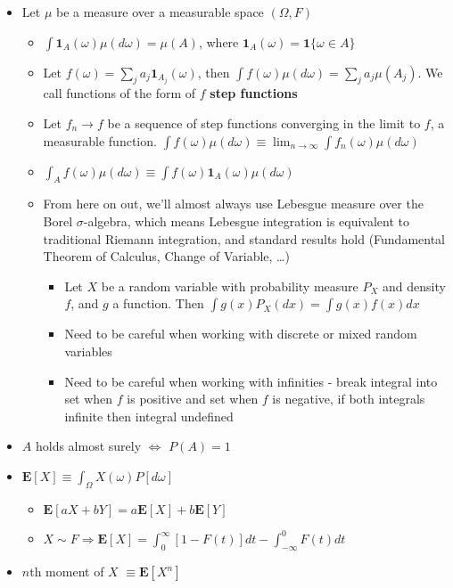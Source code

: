 \documentclass[12pt,english]{article}
\begin{document}
\begin{itemize}
	\item Let $\mu$ be a measure over a measurable space $(\Omega, F)$
	\begin{itemize}
		\item $\int \mathbf{1}_{A}(\omega) \mu(d\omega) = \mu(A)$, where $\mathbf{1}_{A}(\omega) = \mathbf{1} \{ \omega \in A \}$
		\item Let $f(\omega) = \sum_{j} a_{j} \mathbf{1}_{A_{j}}(\omega)$, then $\int f(\omega) \mu(d\omega) = \sum_{j} a_{j} \mu(A_{j})$. We call functions of the form of $f$ \textbf{step functions}
		\item Let $f_{n} \to f$ be a sequence of step functions converging in the limit to $f$, a measurable function. $\int f(\omega) \mu(d\omega) \equiv \lim_{n \to \infty} \int f_{n}(\omega) \mu(d\omega)$
		\item $\int_{A} f(\omega) \mu(d\omega) \equiv \int f(\omega) \mathbf{1}_{A}(\omega) \mu(d\omega)$
		\item From here on out, we'll almost always use Lebesgue measure over the Borel $\sigma$-algebra, which means Lebesgue integration is equivalent to traditional Riemann integration, and standard results hold (Fundamental Theorem of Calculus, Change of Variable, \ldots)
		\begin{itemize}
			\item Let $X$ be a random variable with probability measure $P_{X}$ and density $f$, and $g$ a function. Then $\int g(x) P_{X}(dx) = \int g(x) f(x) dx$
			\item Need to be careful when working with discrete or mixed random variables
			\item Need to be careful when working with infinities - break integral into set when $f$ is positive and set when $f$ is negative, if both integrals infinite then integral undefined
		\end{itemize}
	\end{itemize}
	\item $A$ holds almost surely $\Leftrightarrow$ $P(A) = 1$
	\item $\mathbf{E}[X] \equiv \int_{\Omega} X(\omega) P[d\omega]$
	\begin{itemize}
		\item $\mathbf{E}[aX + bY] = a\mathbf{E}[X] + b \mathbf{E}[Y]$
		\item $X \sim F \Rightarrow \mathbf{E}[X] = \int_{0}^{\infty} [1 - F(t)]dt - \int_{-\infty}^{0} F(t) dt$
	\end{itemize}
	\item $n$th moment of $X$ $\equiv \mathbf{E}[X^{n}]$

\end{itemize}
\end{document}
